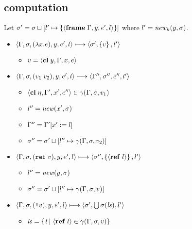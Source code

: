 \documentclass{article}
\begin{document}
\begin{minipage}{\textwidth}
\begin{minipage}[t]{0.49\textwidth}

\subsection{computation}
Let $\sigma'=\sigma\sqcup[l'\mapsto\left\{\langle\mathbf{frame}\; \Gamma,y,e',l\rangle\right\}]$ where $l'=\mathit{new}_k(y,\sigma)$.

\begin{itemize}
\item $\langle\Gamma,\sigma,(\lambda x.e),y,e',l\rangle \longmapsto \langle \sigma',\left\{v\right\}, l'\rangle$

\begin{itemize}
\item $v = \langle\mathbf{cl}\; y,\Gamma,x,e\rangle$
\end{itemize}

\item $\langle\Gamma,\sigma,(v_1\;v_2),y,e',l\rangle \longmapsto \langle\Gamma'',\sigma'',e'',l'\rangle$

\begin{itemize}
\item $\langle\mathbf{cl}\; \eta,\Gamma',x',e''\rangle\in\gamma(\Gamma,\sigma,v_1)$
\item $l''=\mathit{new}(x',\sigma)$
\item $\Gamma''=\Gamma'[x':=l]$
\item $\sigma''=\sigma'\sqcup[l''\mapsto\gamma(\Gamma,\sigma,v_2)]$
\end{itemize}

\item $\langle\Gamma,\sigma,(\mathtt{ref}\; v),y,e',l\rangle \longmapsto \langle\sigma'', \left\{\langle\mathbf{ref}\; l\rangle\right\},l'\rangle$

\begin{itemize}
  \item $l''=\mathit{new}(y,\sigma)$
  \item $\sigma''=\sigma'\sqcup[l''\mapsto\gamma(\Gamma,\sigma,v)]$
\end{itemize}

\item $\langle\Gamma,\sigma,(\text{\texttt{!}}v),y,e',l\rangle \longmapsto \langle\sigma', \bigcup\sigma(\mathit{ls}),l'\rangle$

\begin{itemize}
\item $\mathit{ls}=\left\{\left. l \,\right|\, \langle\mathbf{ref}\; l\rangle\in\gamma(\Gamma,\sigma,v) \right\}$
\end{itemize}


\end{itemize}
\end{minipage}
\end{minipage}
\end{document}

